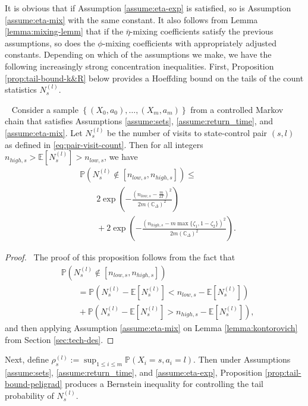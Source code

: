 \documentclass[opre,sglanonrev]{informs4}
\numberwithin{equation}{section}
\newcommand{\pow}[1]{^{(#1)}}
\newcommand{\lp}{\left(}
\newcommand{\rp}{\right)}
\newcommand{\Cbb}{\mathbb{C}}
\newcommand{\Pbb}{\mathbb{P}}
\newcommand{\constant}{\Cbb}
\newcommand{\indexeddata}{\left\{(X_0,a_0),\dots,(X_m,a_m)\right\}}
\newcommand{\prob}{\Pbb}
\newcommand{\expec}{\mathbb{E}}
\begin{document}
{{%
}
It is obvious that if Assumption \ref{assume:eta-exp} is satisfied, so is Assumption \ref{assume:eta-mix} with the same constant. It also follows from Lemma \ref{lemma:mixing-lemm} that if the $\bar \eta$-mixing coefficients satisfy the previous assumptions, so does the $\phi$-mixing coefficients with appropriately adjusted constants. 
Depending on which of the assumptions we make, we have the following increasingly strong concentration inequalities. { First, Proposition \ref{prop:tail-bound-k&R} below provides a Hoeffding bound on the tails of the count statistics $N_s\pow l$. }
\begin{proposition}~\label{prop:tail-bound-k&R} Consider a sample $\indexeddata$ from a controlled Markov chain that satisfies Assumptions \ref{assume:sets}, \ref{assume:return_time}, and \ref{assume:eta-mix}. 
Let $N_s\pow{l}$ be the number of visits to state-control pair $(s,l)$ as defined in \cref{eq:pair-visit-count}. Then for all integers $n_{high,s}> \expec[N_s\pow{l}]> n_{low,s}$, we have 
\begin{align*}
    &\prob(N_s^{(l)}\notin [n_{low,s} ,n_{high,s}])\leq\\
    & \qquad 2 \exp\left({-{\frac{\lp n_{low,s}-\frac{m}{2T}\rp^2}{2m\lp\constant_\Delta\rp^2}}}\right)\\
    & \qquad + 2 \exp\left({-{\frac{\lp n_{high,s}-m\max\{\zeta_1,1-\zeta_2\}\rp^2}{2m\lp\constant_\Delta\rp^2}}}\right).
\end{align*}
\end{proposition}
\begin{proof} \
The proof of this proposition %
follows from the fact that
\begin{align*}
    &\prob(N_s^{(l)}\notin [n_{low,s} ,n_{high,s}]) \\ 
    & \qquad = \prob(N_s^{(l)}-\expec[N_s\pow{l}]< n_{low,s}-\expec[N_s\pow{l}])\\
    & \qquad +\prob(N_s^{(l)}-\expec[N_s\pow{l}]>n_{high,s}-\expec[N_s\pow{l}]),
\end{align*}
and then applying Assumption \ref{assume:eta-mix} on Lemma \ref{lemma:kontorovich} from Section \ref{sec:tech-des}.
\end{proof}
%
Next, define $\rho_{s}\pow{l}:=\sup_{1\leq i\leq m} \prob\lp X_i=s,a_i=l\rp$. { Then under Assumptions \ref{assume:sets}, \ref{assume:return_time}, and \ref{assume:eta-exp}, Proposition \ref{prop:tail-bound-peligrad} produces a Bernstein inequality for controlling the tail probability of $N_s\pow{l}$.}
}
\end{document}
